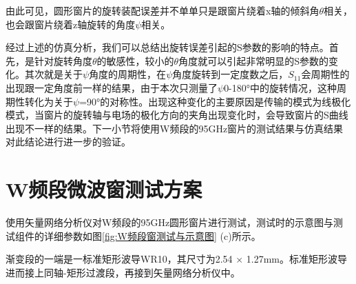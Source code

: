 \documentclass[master]{thesis-uestc}
\begin{document}
由此可见，圆形窗片的旋转装配误差并不单单只是跟窗片绕着x轴的倾斜角$\theta$相关，也会跟窗片绕着z轴旋转的角度$\psi$相关。

经过上述的仿真分析，我们可以总结出旋转误差引起的S参数的影响的特点。首先，是针对旋转角度\(\theta\)的敏感性，较小的\(\theta\)角度就可以引起非常明显的S参数的变化。其次就是关于\(\psi\)角度的周期性，在\(\psi\)角度旋转到一定度数之后，\(S_{11}\)会周期性的出现跟一定角度前一样的结果，由于本次只测量了\(\psi\)0-180°中的旋转情况，这种周期性转化为关于\(\psi\)=90°的对称性。出现这种变化的主要原因是传输的模式为线极化模式，当窗片的旋转轴与电场的极化方向的夹角出现变化时，会导致窗片的S曲线出现不一样的结果。下一小节将使用W频段的95GHz窗片的测试结果与仿真结果对此结论进行进一步的验证。

\section{W频段微波窗测试方案}
使用矢量网络分析仪对W频段的95GHz圆形窗片进行测试，测试时的示意图与测试组件的详细参数如图\ref{fig:W频段窗测试与示意图} (c)所示。

渐变段的一端是一标准矩形波导WR10，其尺寸为2.54 \(\times\) 1.27mm。标准矩形波导进而接上同轴-矩形过渡段，再接到矢量网络分析仪中。
\end{document}

